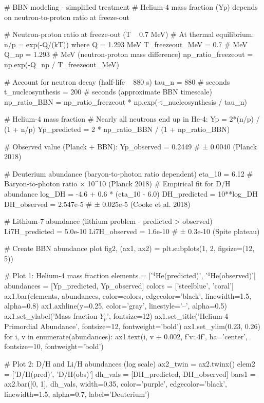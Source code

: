 \documentclass[a4paper, 11pt]{article}
\begin{document}
\begin{pycode}
# BBN modeling - simplified treatment
# Helium-4 mass fraction (Yp) depends on neutron-to-proton ratio at freeze-out

# Neutron-proton ratio at freeze-out (T ~ 0.7 MeV)
# At thermal equilibrium: n/p = exp(-Q/(kT)) where Q = 1.293 MeV
T_freezeout_MeV = 0.7  # MeV
Q_np = 1.293  # MeV (neutron-proton mass difference)
np_ratio_freezeout = np.exp(-Q_np / T_freezeout_MeV)

# Account for neutron decay (half-life ~ 880 s)
tau_n = 880  # seconds
t_nucleosynthesis = 200  # seconds (approximate BBN timescale)
np_ratio_BBN = np_ratio_freezeout * np.exp(-t_nucleosynthesis / tau_n)

# Helium-4 mass fraction
# Nearly all neutrons end up in He-4: Yp = 2*(n/p) / (1 + n/p)
Yp_predicted = 2 * np_ratio_BBN / (1 + np_ratio_BBN)

# Observed value (Planck + BBN):
Yp_observed = 0.2449  # ± 0.0040 (Planck 2018)

# Deuterium abundance (baryon-to-photon ratio dependent)
eta_10 = 6.12  # Baryon-to-photon ratio × 10^10 (Planck 2018)
# Empirical fit for D/H abundance
log_DH = -4.6 + 0.6 * (eta_10 - 6.0)
DH_predicted = 10**log_DH
DH_observed = 2.547e-5  # ± 0.025e-5 (Cooke et al. 2018)

# Lithium-7 abundance (lithium problem - predicted > observed)
Li7H_predicted = 5.0e-10
Li7H_observed = 1.6e-10  # ± 0.3e-10 (Spite plateau)

# Create BBN abundance plot
fig2, (ax1, ax2) = plt.subplots(1, 2, figsize=(12, 5))

# Plot 1: Helium-4 mass fraction
elements = ['$^4$He\n(predicted)', '$^4$He\n(observed)']
abundances = [Yp_predicted, Yp_observed]
colors = ['steelblue', 'coral']
ax1.bar(elements, abundances, color=colors, edgecolor='black', linewidth=1.5, alpha=0.8)
ax1.axhline(y=0.25, color='gray', linestyle='--', alpha=0.5)
ax1.set_ylabel('Mass fraction $Y_p$', fontsize=12)
ax1.set_title('Helium-4 Primordial Abundance', fontsize=12, fontweight='bold')
ax1.set_ylim(0.23, 0.26)
for i, v in enumerate(abundances):
    ax1.text(i, v + 0.002, f'{v:.4f}', ha='center', fontsize=10, fontweight='bold')

# Plot 2: D/H and Li/H abundances (log scale)
ax2_twin = ax2.twinx()
elem2 = ['D/H\n(pred)', 'D/H\n(obs)']
dh_vals = [DH_predicted, DH_observed]
bars1 = ax2.bar([0, 1], dh_vals, width=0.35, color='purple',
                edgecolor='black', linewidth=1.5, alpha=0.7, label='Deuterium')


\end{pycode}
\end{document}
